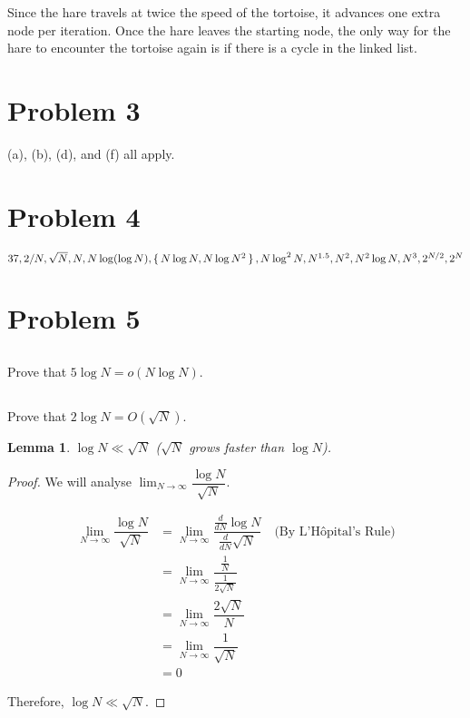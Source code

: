 \documentclass[12pt]{article}
\newtheorem{lemma}[theorem]{Lemma}
\theoremstyle{definition}
\begin{document}
Since the hare travels at twice the speed of the tortoise, it
advances one extra node per iteration. Once the hare leaves the
starting node, the only way for the hare to encounter the tortoise
again is if there is a cycle in the linked list.

\newpage

\section{Problem 3}

(a), (b), (d), and (f) all apply.

\section{Problem 4}

$37, 2 / N, \sqrt N, N, N \log(\log N), \set{N \log N, N \log N^2}, N \log^2
N, \\ N^{1.5}, N^2, N^2 \log N, N^3, 2^{N / 2}, 2^N$

\section{Problem 5}

\subsection{}

Prove that $5 \log N = o(N \log N)$.

\subsection{}

Prove that $2 \log N = O(\sqrt N)$.

\begin{lemma}
  \label{growth}
  $\log N \ll \sqrt N$ ($\sqrt N$ grows faster than $\log N$).
\end{lemma}

\begin{proof}
  We will analyse $\lim_{N \to \infty} \dfrac{\log N}{\sqrt N}$.

  \begin{align*}
    \lim_{N \to \infty} \dfrac{\log N}{\sqrt N} & =
    \lim_{N \to \infty} \dfrac{\frac{d}{dN} \log N}{\frac{d}{dN}
    \sqrt N} \quad \text{(By
    L'Hôpital's Rule)} \\
    & = \lim_{N \to \infty} \dfrac{\frac{1}{N}}{\frac{1}{2 \sqrt N}} \\
    & = \lim_{N \to \infty} \dfrac{2 \sqrt N}{N} \\
    & = \lim_{N \to \infty} \dfrac{1}{\sqrt N} \\
    & = 0
  \end{align*}

  Therefore, $\log N \ll \sqrt N$.
\end{proof}
\end{document}

